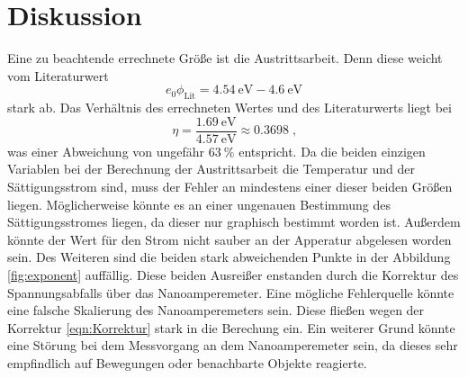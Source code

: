 \section{Diskussion}
\label{sec:Diskussion}
Eine zu beachtende errechnete Größe ist die Austrittsarbeit. Denn diese weicht vom Literaturwert\cite{lit}
\begin{equation*}
    e_0\phi_\text{Lit} =  \SI{4.54}{\electronvolt} - \SI{4.6}{\electronvolt}
\end{equation*}
stark ab. Das Verhältnis des errechneten Wertes und des Literaturwerts liegt bei
\begin{equation*}
    \eta = \frac{\SI{1.69}{\electronvolt}}{\SI{4.57}{\electronvolt}} \approx \num{0.3698} \; \text{,}
\end{equation*}
was einer Abweichung von ungefähr $\SI{63}{\percent}$ entspricht.
Da die beiden einzigen Variablen bei der Berechnung der Austrittsarbeit die Temperatur und der Sättigungsstrom sind, muss der Fehler an mindestens 
einer dieser beiden Größen liegen. Möglicherweise könnte es an einer ungenauen Bestimmung des Sättigungsstromes liegen, da dieser nur graphisch bestimmt worden ist. 
Außerdem könnte der Wert für den Strom nicht sauber an der Apperatur abgelesen worden sein.
Des Weiteren sind die beiden stark abweichenden Punkte in der Abbildung \ref{fig:exponent} auffällig. 
Diese beiden Ausreißer enstanden durch die Korrektur des Spannungsabfalls über das Nanoamperemeter.
Eine mögliche Fehlerquelle könnte eine falsche Skalierung des Nanoamperemeters sein. 
Diese fließen wegen der Korrektur \eqref{eqn:Korrektur} stark in die Berechung ein.
Ein weiterer Grund könnte eine Störung bei dem Messvorgang an dem Nanoamperemeter sein, da dieses sehr empfindlich auf Bewegungen oder 
benachbarte Objekte reagierte.